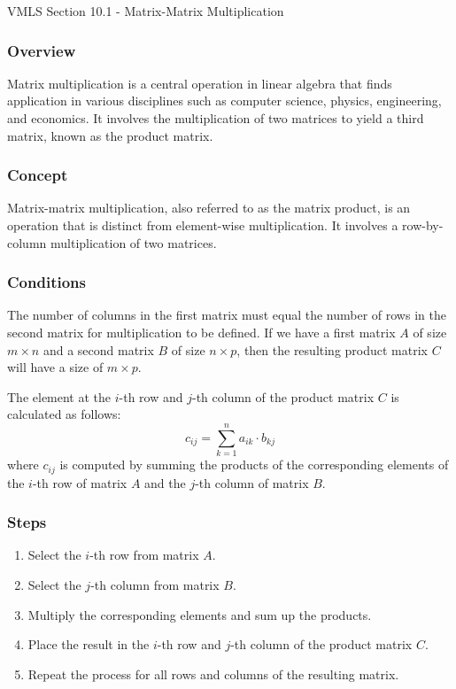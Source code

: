 \begin{notes}{VMLS Section 10.1 - Matrix-Matrix Multiplication}
    \subsubsection*{Overview}

    Matrix multiplication is a central operation in linear algebra that finds application in various disciplines such as computer science, physics, engineering, and economics. It involves the 
    multiplication of two matrices to yield a third matrix, known as the product matrix. \vspace*{1em}

    \subsubsection*{Concept}
    Matrix-matrix multiplication, also referred to as the matrix product, is an operation that is distinct from element-wise multiplication. It involves a row-by-column multiplication of two 
    matrices. \vspace*{1em}
    
    \subsubsection*{Conditions}
    The number of columns in the first matrix must equal the number of rows in the second matrix for multiplication to be defined. If we have a first matrix $A$ of size $m \times n$ 
    and a second matrix $B$ of size $n \times p$, then the resulting product matrix $C$ will have a size of $m \times p$. \vspace*{1em}

    \begin{Highlight}
        The element at the $i$-th row and $j$-th column of the product matrix $C$ is calculated as follows:
        \begin{equation*}
            c_{ij} = \sum_{k=1}^{n} a_{ik} \cdot b_{kj}
        \end{equation*}
        where $c_{ij}$ is computed by summing the products of the corresponding elements of the $i$-th row of matrix $A$ and the $j$-th column of matrix $B$.
        \subsubsection*{Steps}
        \begin{enumerate}
            \item Select the $i$-th row from matrix $A$.
            \item Select the $j$-th column from matrix $B$.
            \item Multiply the corresponding elements and sum up the products.
            \item Place the result in the $i$-th row and $j$-th column of the product matrix $C$.
            \item Repeat the process for all rows and columns of the resulting matrix.
        \end{enumerate}
    \end{Highlight}
    

\end{notes}
